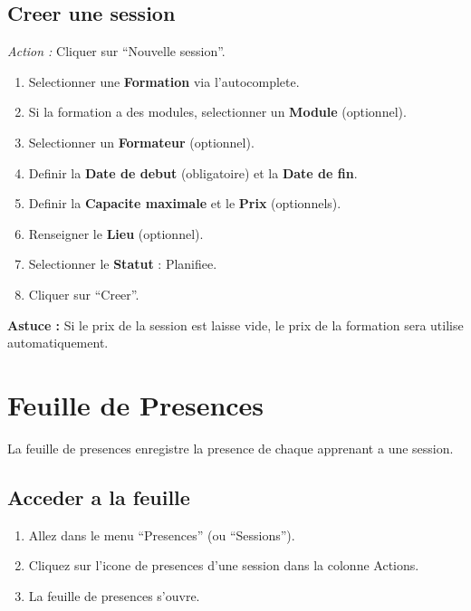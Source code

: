 \documentclass[a4paper,11pt]{article}
\newcommand{\etape}[1]{\textcolor{step}{\textbf{\'Etape :} #1}}
\newcommand{\astuce}[1]{\textcolor{tip}{\textbf{Astuce :} #1}}
\newcommand{\action}[1]{\textcolor{brand}{\textit{Action :} #1}}
\begin{document}
\subsection{Creer une session}
\action{Cliquer sur ``Nouvelle session''.}
\begin{enumerate}[label=\etape{\arabic*}]
  \item Selectionner une \textbf{Formation} via l'autocomplete.
  \item Si la formation a des modules, selectionner un \textbf{Module} (optionnel).
  \item Selectionner un \textbf{Formateur} (optionnel).
  \item Definir la \textbf{Date de debut} (obligatoire) et la \textbf{Date de fin}.
  \item Definir la \textbf{Capacite maximale} et le \textbf{Prix} (optionnels).
  \item Renseigner le \textbf{Lieu} (optionnel).
  \item Selectionner le \textbf{Statut} : Planifiee.
  \item Cliquer sur ``Creer''.
\end{enumerate}

\astuce{Si le prix de la session est laisse vide, le prix de la formation sera utilise automatiquement.}


\section{Feuille de Presences}

La feuille de presences enregistre la presence de chaque apprenant a une session.

\subsection{Acceder a la feuille}
\begin{enumerate}[label=\etape{\arabic*}]
  \item Allez dans le menu ``Presences'' (ou ``Sessions'').
  \item Cliquez sur l'icone de presences d'une session dans la colonne Actions.
  \item La feuille de presences s'ouvre.
\end{enumerate}
\end{document}
